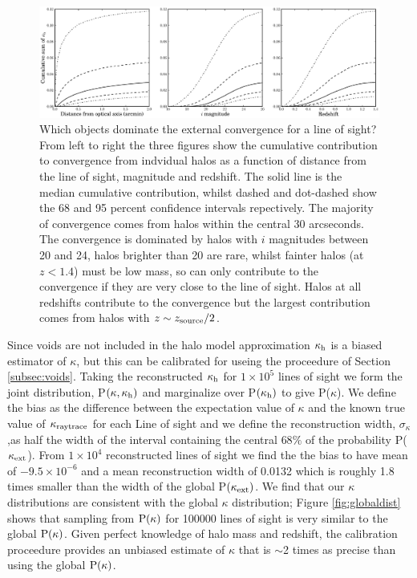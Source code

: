 \documentclass[useAMS,usenatbib]{mn2e}
\begin{document}
\begin{figure}
\includegraphics[width=\textwidth]{figs/where_is_the_kappa.eps}
\caption[magcut]{Which objects dominate the external convergence for a line of sight? From left to right the three figures show the cumulative contribution to convergence from indvidual halos as a function of distance from the line of sight, magnitude and redshift. The solid line is the median cumulative contribution, whilst dashed and dot-dashed show the 68 and 95 percent confidence intervals repectively. The majority of convergence comes from halos within the central 30 arcseconds. The convergence is dominated by halos with $i$ magnitudes between 20 and 24, halos brighter than 20 are rare, whilst fainter halos (at $z<1.4$) must be low mass, so can only contribute to the convergence if they are very close to the line of sight. Halos at all redshifts contribute to the convergence but the largest contribution comes from halos with $z \sim z_{\rm source}/2$.}
\label{fig:where}
\end{figure}

Since voids are not included in the halo model approximation $\kappa_{\rm h}$
is a biased estimator of $\kappa$, but this can be calibrated for useing
the proceedure of Section \ref{subsec:voids}. Taking the reconstructed
$\kappa_{\rm h}$ for $1\times 10^{5}$ lines of sight we form the joint
distribution, P$(\kappa,\kappa_{\rm h})$ and marginalize over P$(\kappa_{\rm h})$ to
give P($\kappa$). We define the bias as the difference between the
expectation value of $\kappa$ and the known true value of $\kappa_{\rm raytrace}$
for each Line of sight and we define the reconstruction width,
$\sigma_{\kappa}$,as half the width of the interval containing the
central $68\%$ of the probability P($\kappa_{\rm ext}$). From $1\times 10^{4}$
reconstructed lines of sight we find the the bias to have mean of
$-9.5\times 10^{-6}$ and a mean reconstruction width of 0.0132 which is
roughly 1.8 times smaller than the width of the global P$(\kappa_{\rm ext})$. We
find that our $\kappa$ distributions are consistent with the global
$\kappa$ distribution; Figure \ref{fig:globaldist} shows that sampling
from ${\rm P}(\kappa)$ for 100000 lines of sight is very similar to the
global ${\rm P}(\kappa)$. Given perfect knowledge of halo mass and redshift,
the calibration proceedure provides an unbiased estimate of $\kappa$
that is $\sim$2 times as precise than using the global ${\rm P}(\kappa)$.
\end{document}
